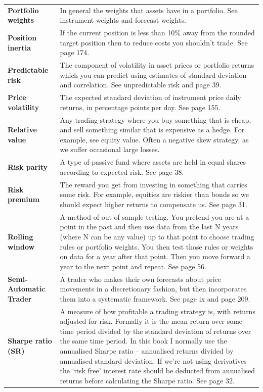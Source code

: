 {\begin{longtable}{@{}>{\raggedright\arraybackslash\bfseries} p{}>{\raggedright\arraybackslash} p{}@{}}
Portfolio weights & In general the weights that assets have in a portfolio. See instrument weights and forecast weights. \\[0.65em]
Position inertia & If the current position is less than 10\% away from the rounded target position then to reduce costs you shouldn’t trade. See page 174. \\[0.65em]
Predictable risk & The component of volatility in asset prices or portfolio returns which you can predict using estimates of standard deviation and correlation. See unpredictable risk and page 39. \\[0.65em]
Price volatility & The expected standard deviation of instrument price daily returns, in percentage points per day. See page 155. \\[0.65em]
Relative value & Any trading strategy where you buy something that is cheap, and sell something similar that is expensive as a hedge. For example, see equity value. Often a negative skew strategy, as we suffer occasional large losses. \\[0.65em]
Risk parity & A type of passive fund where assets are held in equal shares according to expected risk. See page 38. \\[0.65em]
Risk premium & The reward you get from investing in something that carries some risk. For example, equities are riskier than bonds so we should expect higher returns to compensate us. See page 31. \\[0.65em]
Rolling window & A method of out of sample testing. You pretend you are at a point in the past and then use data from the last N years (where N can be any value) up to that point to choose trading rules or portfolio weights. You then test those rules or weights on data for a year after that point. Then you move forward a year to the next point and repeat. See page 56. \\[0.65em]
Semi-Automatic Trader & A trader who makes their own forecasts about price movements in a discretionary fashion, but then incorporates them into a systematic framework. See page ix and page 209. \\[0.65em]
Sharpe ratio (SR) & A measure of how profitable a trading strategy is, with returns adjusted for risk. Formally it is the mean return over some time period divided by the standard deviation of returns over the same time period. In this book I normally use the annualised Sharpe ratio – annualised returns divided by annualised standard deviation. If we’re not using derivatives the ‘risk free’ interest rate should be deducted from annualised returns before calculating the Sharpe ratio. See page 32. \\[0.65em]

\end{longtable}}

